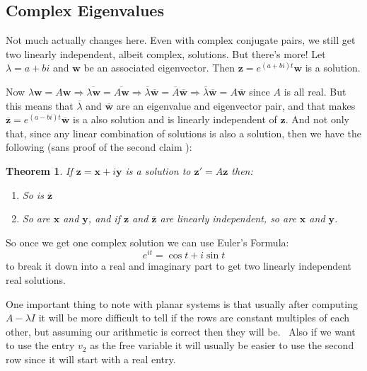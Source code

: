 \documentclass[letterpaper, 11pt, openany]{book}
\theoremstyle{mytheoremstyle}
\newtheorem{theorem}{Theorem}[section]
\theoremstyle{myexamplestyle}
\begin{document}
\subsection{Complex Eigenvalues}
Not much actually changes here. Even with complex conjugate pairs, we still get two linearly independent, albeit complex, solutions. But there's more! Let \(\lambda = a + bi\) and \(\mathbf{w}\) be an associated eigenvector. Then \(\mathbf{z} = e^{(a + bi)t}\mathbf{w}\) is a solution.

Now \(\lambda \mathbf{w} = A \mathbf{w} \Rightarrow \overline{\lambda \mathbf{w}} = \overline{A \mathbf{w}} \Rightarrow \overline{\lambda} \overline{\mathbf{w}} = \overline{A} \overline{\mathbf{w}} \Rightarrow  \overline{\lambda} \overline{\mathbf{w}} = A \overline{\mathbf{w}}\) since \(A\) is all real. But this means that \(\overline{\lambda}\) and \(\overline{\mathbf{w}}\) are an eigenvalue and eigenvector pair, and that makes \(\overline{\mathbf{z}} = e^{(a - bi)t}\overline{\mathbf{w}}\) is a also solution and is linearly independent of \(\mathbf{z}\). And not only that, since any linear combination of solutions is also a solution, then we have the following (sans proof of the second claim \faMeh):

\begin{theorem}\label{t:complex-to-real-solns}
    If \(\mathbf{z} = \mathbf{x} + i\mathbf{y}\) is a solution to \(\mathbf{z}' = A \mathbf{z}\) then:
    \begin{enumerate}
        \item So is \(\overline{\mathbf{z}}\)
        \item So are \(\mathbf{x}\) and \(\mathbf{y}\), and if \(\mathbf{z}\) and \(\overline{\mathbf{z}}\) are linearly independent, so are \(\mathbf{x}\) and \(\mathbf{y}\).
    \end{enumerate}
\end{theorem}
So once we get one complex solution we can use Euler's Formula:
\[e^{it} = \cos t + i \sin t\]
to break it down into a real and imaginary part to get two linearly independent real solutions.

One important thing to note with planar systems is that usually after computing \(A - \lambda I\) it will be more difficult to tell if the rows are constant multiples of each other, but assuming our arithmetic is correct then they will be. \faSmile \ Also if we want to use the entry \(v_{2}\) as the free variable it will usually be easier to use the second row since it will start with a real entry.
\end{document}
